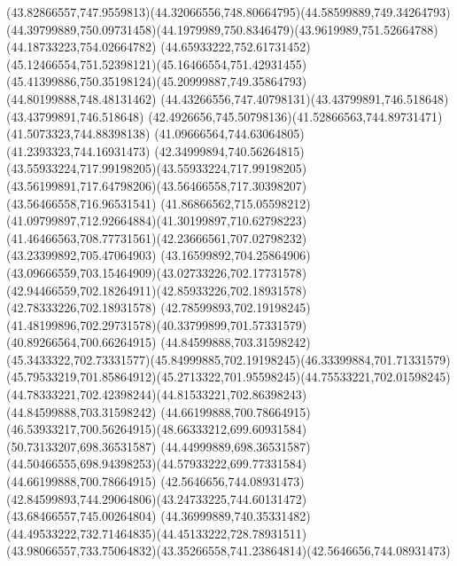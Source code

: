 {{\curveto(43.82866557,747.9559813)(44.32066556,748.80664795)(44.58599889,749.34264793)
\curveto(44.39799889,750.09731458)(44.1979989,750.8346479)(43.9619989,751.52664788)
\lineto(44.18733223,754.02664782)
\curveto(44.65933222,752.61731452)(45.12466554,751.52398121)(45.16466554,751.42931455)
\curveto(45.41399886,750.35198124)(45.20999887,749.35864793)(44.80199888,748.48131462)
\curveto(44.43266556,747.40798131)(43.43799891,746.518648)(43.43799891,746.518648)
\curveto(42.4926656,745.50798136)(41.52866563,744.89731471)(41.5073323,744.88398138)
\lineto(41.09666564,744.63064805)
\lineto(41.2393323,744.16931473)
\curveto(42.34999894,740.56264815)(43.55933224,717.99198205)(43.55933224,717.99198205)
\curveto(43.56199891,717.64798206)(43.56466558,717.30398207)(43.56466558,716.96531541)
\curveto(41.86866562,715.05598212)(41.09799897,712.92664884)(41.30199897,710.62798223)
\curveto(41.46466563,708.77731561)(42.23666561,707.02798232)(43.23399892,705.47064903)
\curveto(43.16599892,704.25864906)(43.09666559,703.15464909)(43.02733226,702.17731578)
\curveto(42.94466559,702.18264911)(42.85933226,702.18931578)(42.78333226,702.18931578)
\lineto(42.78599893,702.19198245)
\curveto(41.48199896,702.29731578)(40.33799899,701.57331579)(40.89266564,700.66264915)
\moveto(44.84599888,703.31598242)
\curveto(45.3433322,702.73331577)(45.84999885,702.19198245)(46.33399884,701.71331579)
\curveto(45.79533219,701.85864912)(45.2713322,701.95598245)(44.75533221,702.01598245)
\curveto(44.78333221,702.42398244)(44.81533221,702.86398243)(44.84599888,703.31598242)
\moveto(44.66199888,700.78664915)
\curveto(46.53933217,700.56264915)(48.66333212,699.60931584)(50.73133207,698.36531587)
\lineto(44.44999889,698.36531587)
\curveto(44.50466555,698.94398253)(44.57933222,699.77331584)(44.66199888,700.78664915)
\moveto(42.5646656,744.08931473)
\curveto(42.84599893,744.29064806)(43.24733225,744.60131472)(43.68466557,745.00264804)
\curveto(44.36999889,740.35331482)(44.49533222,732.71464835)(44.45133222,728.78931511)
\curveto(43.98066557,733.75064832)(43.35266558,741.23864814)(42.5646656,744.08931473)
}
}
{
}
